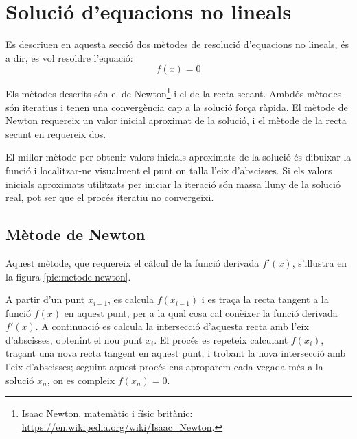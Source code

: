 \section{Solució d'equacions no lineals}\label{sec:func-no-lin}

Es descriuen en aquesta secció dos mètodes de resolució d'equacions no lineals, és a dir, es vol resoldre l'equació: \begin{equation}
   f(x) = 0 \end{equation}

Els mètodes descrits són el de Newton\footnote{Isaac Newton, matemàtic i físic britànic: \href{https://en.wikipedia.org/wiki/Isaac_Newton}{https:/\!\!/en.wikipedia.org/wiki/Isaac\_Newton}.} i el de la recta secant. Ambdós mètodes són iteratius i tenen una convergència cap a la solució força ràpida. El mètode de Newton requereix un valor inicial aproximat de la solució, i el mètode de la recta secant en requereix dos.

El millor mètode per obtenir valors inicials aproximats de la solució és dibuixar la funció i localitzar-ne visualment el punt on talla l'eix d'abscisses. Si els valors inicials aproximats utilitzats per iniciar la iteració són massa lluny de la solució real, pot ser que el procés iteratiu no convergeixi.


\subsection{Mètode de Newton}\label{sec:metode-newton}

Aquest mètode, que requereix el càlcul de la funció derivada $f'(x)$, s'iŀlustra en la figura \vref{pic:metode-newton}.

A partir d'un punt $x_{i-1}$, es calcula $f(x_{i-1})$ i es traça la recta tangent a la funció $f(x)$ en aquest punt, per a la qual cosa cal conèixer la funció derivada $f'(x)$. A continuació es calcula la intersecció d'aquesta recta amb l'eix d'abscisses, obtenint el nou punt $x_i$. El procés es repeteix calculant $f(x_i)$, traçant una nova recta tangent en aquest punt, i trobant la nova intersecció amb l'eix d'abscisses; seguint aquest procés ens aproparem cada vegada més a la solució $x_n$, on es compleix $f(x_n)=0$.

\begin{center}
    
    \label{pic:metode-newton}
\end{center}

